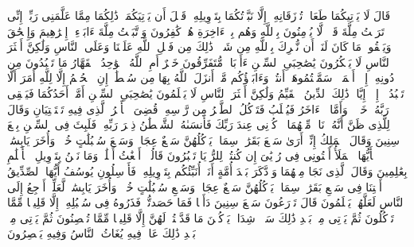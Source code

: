 \stopbuffer
\startbuffer[\q:12:37]
قَالَ لَا یَأۡتِیكُمَا طَعَامࣱ تُرۡزَقَانِهِۦۤ إِلَّا نَبَّأۡتُكُمَا بِتَأۡوِیلِهِۦ قَبۡلَ أَن یَأۡتِیَكُمَاۚ ذَٰلِكُمَا مِمَّا عَلَّمَنِی رَبِّیۤۚ إِنِّی تَرَكۡتُ مِلَّةَ قَوۡمࣲ لَّا یُؤۡمِنُونَ بِٱللَّهِ وَهُم بِٱلۡءَاخِرَةِ هُمۡ كَٰفِرُونَ%
\stopbuffer
\startbuffer[\q:12:38]
وَٱتَّبَعۡتُ مِلَّةَ ءَابَاۤءِیۤ إِبۡرَٰهِیمَ وَإِسۡحَٰقَ وَیَعۡقُوبَۚ مَا كَانَ لَنَاۤ أَن نُّشۡرِكَ بِٱللَّهِ مِن شَیۡءࣲۚ ذَٰلِكَ مِن فَضۡلِ ٱللَّهِ عَلَیۡنَا وَعَلَى ٱلنَّاسِ وَلَٰكِنَّ أَكۡثَرَ ٱلنَّاسِ لَا یَشۡكُرُونَ%
\stopbuffer
\startbuffer[\q:12:39]
یَٰصَٰحِبَیِ ٱلسِّجۡنِ ءَأَرۡبَابࣱ مُّتَفَرِّقُونَ خَیۡرٌ أَمِ ٱللَّهُ ٱلۡوَٰحِدُ ٱلۡقَهَّارُ%
\stopbuffer
\startbuffer[\q:12:40]
مَا تَعۡبُدُونَ مِن دُونِهِۦۤ إِلَّاۤ أَسۡمَاۤءࣰ سَمَّیۡتُمُوهَاۤ أَنتُمۡ وَءَابَاۤؤُكُم مَّاۤ أَنزَلَ ٱللَّهُ بِهَا مِن سُلۡطَٰنٍۚ إِنِ ٱلۡحُكۡمُ إِلَّا لِلَّهِ أَمَرَ أَلَّا تَعۡبُدُوۤا۟ إِلَّاۤ إِیَّاهُۚ ذَٰلِكَ ٱلدِّینُ ٱلۡقَیِّمُ وَلَٰكِنَّ أَكۡثَرَ ٱلنَّاسِ لَا یَعۡلَمُونَ%
\stopbuffer
\startbuffer[\q:12:41]
یَٰصَٰحِبَیِ ٱلسِّجۡنِ أَمَّاۤ أَحَدُكُمَا فَیَسۡقِی رَبَّهُۥ خَمۡرࣰاۖ وَأَمَّا ٱلۡءَاخَرُ فَیُصۡلَبُ فَتَأۡكُلُ ٱلطَّیۡرُ مِن رَّأۡسِهِۦۚ قُضِیَ ٱلۡأَمۡرُ ٱلَّذِی فِیهِ تَسۡتَفۡتِیَانِ%
\stopbuffer
\startbuffer[\q:12:42]
وَقَالَ لِلَّذِی ظَنَّ أَنَّهُۥ نَاجࣲ مِّنۡهُمَا ٱذۡكُرۡنِی عِندَ رَبِّكَ فَأَنسَىٰهُ ٱلشَّیۡطَٰنُ ذِكۡرَ رَبِّهِۦ فَلَبِثَ فِی ٱلسِّجۡنِ بِضۡعَ سِنِینَ%
\stopbuffer
\startbuffer[\q:12:43]
وَقَالَ ٱلۡمَلِكُ إِنِّیۤ أَرَىٰ سَبۡعَ بَقَرَٰتࣲ سِمَانࣲ یَأۡكُلُهُنَّ سَبۡعٌ عِجَافࣱ وَسَبۡعَ سُنۢبُلَٰتٍ خُضۡرࣲ وَأُخَرَ یَابِسَٰتࣲۖ یَٰۤأَیُّهَا ٱلۡمَلَأُ أَفۡتُونِی فِی رُءۡیَٰیَ إِن كُنتُمۡ لِلرُّءۡیَا تَعۡبُرُونَ%
\stopbuffer
\startbuffer[\q:12:44]
قَالُوۤا۟ أَضۡغَٰثُ أَحۡلَٰمࣲۖ وَمَا نَحۡنُ بِتَأۡوِیلِ ٱلۡأَحۡلَٰمِ بِعَٰلِمِینَ%
\stopbuffer
\startbuffer[\q:12:45]
وَقَالَ ٱلَّذِی نَجَا مِنۡهُمَا وَٱدَّكَرَ بَعۡدَ أُمَّةٍ أَنَا۠ أُنَبِّئُكُم بِتَأۡوِیلِهِۦ فَأَرۡسِلُونِ%
\stopbuffer
\startbuffer[\q:12:46]
یُوسُفُ أَیُّهَا ٱلصِّدِّیقُ أَفۡتِنَا فِی سَبۡعِ بَقَرَٰتࣲ سِمَانࣲ یَأۡكُلُهُنَّ سَبۡعٌ عِجَافࣱ وَسَبۡعِ سُنۢبُلَٰتٍ خُضۡرࣲ وَأُخَرَ یَابِسَٰتࣲ لَّعَلِّیۤ أَرۡجِعُ إِلَى ٱلنَّاسِ لَعَلَّهُمۡ یَعۡلَمُونَ%
\stopbuffer
\startbuffer[\q:12:47]
قَالَ تَزۡرَعُونَ سَبۡعَ سِنِینَ دَأَبࣰا فَمَا حَصَدتُّمۡ فَذَرُوهُ فِی سُنۢبُلِهِۦۤ إِلَّا قَلِیلࣰا مِّمَّا تَأۡكُلُونَ%
\stopbuffer
\startbuffer[\q:12:48]
ثُمَّ یَأۡتِی مِنۢ بَعۡدِ ذَٰلِكَ سَبۡعࣱ شِدَادࣱ یَأۡكُلۡنَ مَا قَدَّمۡتُمۡ لَهُنَّ إِلَّا قَلِیلࣰا مِّمَّا تُحۡصِنُونَ%
\stopbuffer
\startbuffer[\q:12:49]
ثُمَّ یَأۡتِی مِنۢ بَعۡدِ ذَٰلِكَ عَامࣱ فِیهِ یُغَاثُ ٱلنَّاسُ وَفِیهِ یَعۡصِرُونَ%
\stopbuffer
\startbuffer[\q:12:50]
